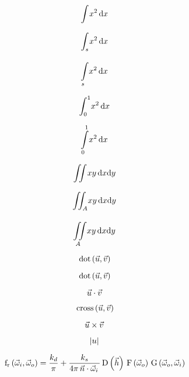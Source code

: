 \documentclass{article}
\begin{document}
\begin{equation}
  \integral{x^2}{x}
\end{equation}

\begin{equation}
  \integral[s]{x^2}{x}
\end{equation}

\begin{equation}
  \integral*[s]{x^2}{x}
\end{equation}

\begin{equation}
  \integral[0][1]{x^2}{x}
\end{equation}

\begin{equation}
  \integral*[0][1]{x^2}{x}
\end{equation}

\begin{equation}
  \iintegral{xy}{x}{y}
\end{equation}

\begin{equation}
  \iintegral[A]{xy}{x}{y}
\end{equation}

\begin{equation}
  \iintegral*[A]{xy}{x}{y}
\end{equation}

\begin{equation}
  \, \mathrm{dot} \left( {\vec u, \vec v} \right)
\end{equation}

\begin{equation}
  \, \mathrm{dot} \left( {\vec u, \vec v} \right)
\end{equation}

\begin{equation}
  \, \vec u \cdot \vec v \,
\end{equation}

\begin{equation}
  \, \mathrm{cross} \left( {\vec u, \vec v} \right)
\end{equation}

\begin{equation}
  \vec u \times \vec v
\end{equation}

\begin{equation}
  \left\lvert u \right\rvert
\end{equation}

\begin{equation}
  \, \mathrm{f_r} \left( {\vec \omega_i, \vec \omega_o} \right) = \frac{k_d}{\pi} + \frac{k_s}{4\pi \, \vec n \cdot \vec \omega_i \,} \, \mathrm{D} \left( {\vec h} \right) \, \mathrm{F} \left( {\vec \omega_o} \right) \, \mathrm{G} \left( {\vec \omega_o, \vec \omega_i} \right)
\end{equation}
\end{document}
